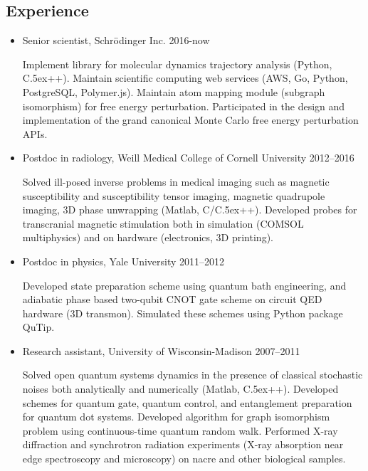 \documentclass[centered,11pt,overlapped]{res}
\def\Cplusplus{{\rm C\raise.5ex\hbox{\small ++}}}
\begin{document}
\begin{resume}
\section{\sc Experience}

\begin{itemize}[leftmargin=-0.02in]
\item Senior scientist, Schr\"odinger Inc. \hfill 2016-now

Implement library for molecular dynamics trajectory analysis (Python, \Cplusplus).
Maintain scientific computing web services (AWS, Go, Python, PostgreSQL, Polymer.js).
Maintain atom mapping module (subgraph isomorphism) for free energy perturbation.
Participated in the design and implementation of the grand canonical Monte Carlo
free energy perturbation APIs.

\item Postdoc in radiology, Weill Medical College of Cornell University \hfill 2012--2016

Solved ill-posed inverse problems in medical imaging such as magnetic susceptibility and
susceptibility tensor imaging, magnetic quadrupole imaging, 3D phase unwrapping
(Matlab, C/\Cplusplus).
Developed probes for transcranial magnetic stimulation both in simulation (COMSOL multiphysics)
and on hardware (electronics, 3D printing).

\item Postdoc in physics, Yale University \hfill 2011--2012

Developed state preparation scheme using quantum bath engineering, and adiabatic
phase based two-qubit CNOT gate scheme on circuit QED hardware (3D transmon).
Simulated these schemes using Python package QuTip.

\item {Research assistant, University of Wisconsin-Madison} \hfill {2007--2011}

Solved open quantum systems dynamics in the presence of classical stochastic noises
both analytically and numerically (Matlab, \Cplusplus).
Developed schemes for quantum gate, quantum control, and entanglement preparation
for quantum dot systems.
Developed algorithm for graph isomorphism problem using continuous-time quantum random walk.
Performed X-ray diffraction and synchrotron radiation experiments (X-ray absorption near edge spectroscopy and microscopy) on nacre and other biological samples.

\end{itemize}



\end{resume}
\end{document}
